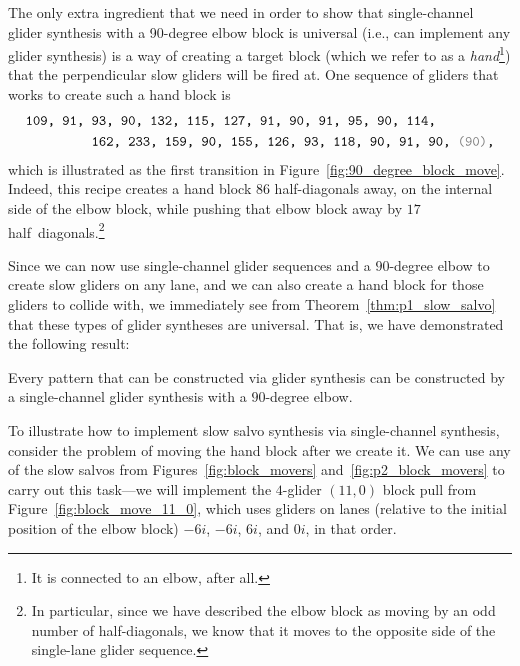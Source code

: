 The only extra ingredient that we need in order to show that single-channel glider synthesis with a 90-degree elbow block is universal (i.e., can implement any glider synthesis) is a way of creating a target block (which we refer to as a \emph{hand}\footnote{It is connected to an elbow, after all.}) that the perpendicular slow gliders will be fired at. One sequence of gliders that works to create such a hand block is
\begin{align}\begin{split}\label{eq:make_hand_90_deg}
& \text{\texttt{109, 91, 93, 90, 132, 115, 127, 91, 90, 91, 95, 90, 114,}} \\
& \text{\texttt{~~~~~~~~~162, 233, 159, 90, 155, 126, 93, 118, 90, 91, 90, {\color{gray}(90)},}}
\end{split}\end{align}
which is illustrated as the first transition in Figure~\ref{fig:90_degree_block_move}. Indeed, this recipe creates a hand block $86$ half-diagonals away, on the internal side of the elbow block, while pushing that elbow block away by $17$ half~diagonals.\footnote{In particular, since we have described the elbow block as moving by an odd number of half-diagonals, we know that it moves to the opposite side of the single-lane glider sequence.}

Since we can now use single-channel glider sequences and a $90$-degree elbow to create slow gliders on any lane, and we can also create a hand block for those gliders to collide with, we immediately see from Theorem~\ref{thm:p1_slow_salvo} that these types of glider syntheses are universal. That is, we have demonstrated the following result:

\begin{theorem}\label{thm:single_channel_90_degree}
	Every pattern that can be constructed via glider synthesis can be constructed by a single-channel glider synthesis with a $90$-degree elbow.
\end{theorem}

To illustrate how to implement slow salvo synthesis via single-channel synthesis, consider the problem of moving the hand block after we create it. We can use any of the slow salvos from Figures~\ref{fig:block_movers} and~\ref{fig:p2_block_movers} to carry out this task---we will implement the $4$-glider $(11,0)$ block pull from Figure~\ref{fig:block_move_11_0}, which uses gliders on lanes (relative to the initial position of the elbow block) $-6i$, $-6i$, $6i$, and $0i$, in that order.


